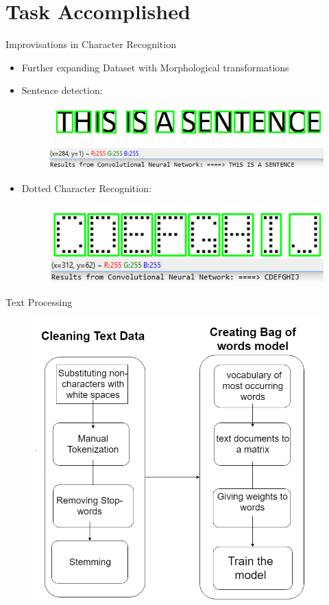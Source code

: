 \documentclass[10pt, a4paper]{beamer}
\begin{document}
\section{Task Accomplished}
\begin{frame}{Improvisations in Character Recognition}
\begin{itemize}
\item Further expanding Dataset with Morphological transformations
\item Sentence detection:
    \begin{figure}
 	    \includegraphics[height=0.27 \textheight]{testSENTENCE.png}
	\end{figure}

\item Dotted Character Recognition:
    \begin{figure}
 	    \includegraphics[height=0.27 \textheight]{test_CDEFGHIJ_dotted.png}
	\end{figure}
\end{itemize}
\end{frame}


\begin{frame}{Text Processing}
    \begin{figure}
 	    \includegraphics[height=0.90 \textheight]{flowchart_2.png}
	\end{figure}
\end{frame}
\end{document}
